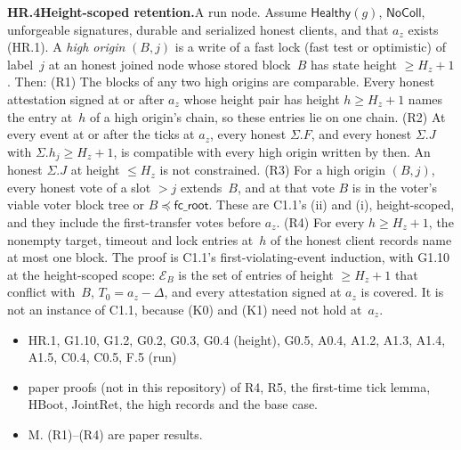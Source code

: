 \documentclass{article}
\newcommand{\fcroot}{\mathsf{fc\_root}}
\newcommand{\dagnode}[6]{%
\par\medskip\noindent\textbf{#1\enspace #2.}\enspace #3
\begin{itemize}[leftmargin=2.2em,itemsep=0pt,topsep=2pt]
\item[\emph{Uses}] #4
\item[\emph{Evid.}] #5
\item[\emph{Task}] #6
\end{itemize}}
\begin{document}
\dagnode{HR.4}{Height-scoped retention}{A run node.  Assume
$\mathsf{Healthy}(g)$, $\mathsf{NoColl}$, unforgeable signatures, durable and
serialized honest clients, and that $a_z$ exists (HR.1).  A \emph{high origin}
$(B,j)$ is a write of a fast lock (fast test or optimistic) of label~$j$ at an
honest joined node whose stored block~$B$ has state height $\geq H_z+1$.
Then:
(R1) The blocks of any two high origins are comparable.  Every honest
attestation signed at or after $a_z$ whose height pair has height
$h\geq H_z+1$ names the entry at~$h$ of a high origin's chain, so these
entries lie on one chain.
(R2) At every event at or after the ticks at $a_z$, every honest $\Sigma.F$,
and every honest $\Sigma.J$ with $\Sigma.h_j\geq H_z+1$, is compatible with
every high origin written by then.  An honest $\Sigma.J$ at height
$\leq H_z$ is not constrained.
(R3) For a high origin $(B,j)$, every honest vote of a slot $>j$ extends~$B$,
and at that vote $B$ is in the voter's viable voter block tree or
$B\preceq\fcroot$.  These are C1.1's (ii) and (i), height-scoped, and they
include the first-transfer votes before $a_z$.
(R4) For every $h\geq H_z+1$, the nonempty target, timeout and lock entries
at~$h$ of the honest client records name at most one block.
The proof is C1.1's first-violating-event induction, with G1.10 at the
height-scoped scope: $\mathcal E_B$ is the set of entries of height
$\geq H_z+1$ that conflict with~$B$, $T_0=a_z-\Delta$, and every attestation signed
at $a_z$ is covered.  It is not an instance of C1.1, because (K0) and (K1)
need not hold at~$a_z$.}
{HR.1, G1.10, G1.2, G0.2, G0.3, G0.4 (height), G0.5, A0.4, A1.2, A1.3, A1.4,
A1.5, C0.4, C0.5, F.5 (run)}
{paper proofs (not in this repository) of R4, R5, the first-time tick lemma,
HBoot, JointRet, the high records and the base case.}
{M.  (R1)--(R4) are paper results.}
\end{document}
